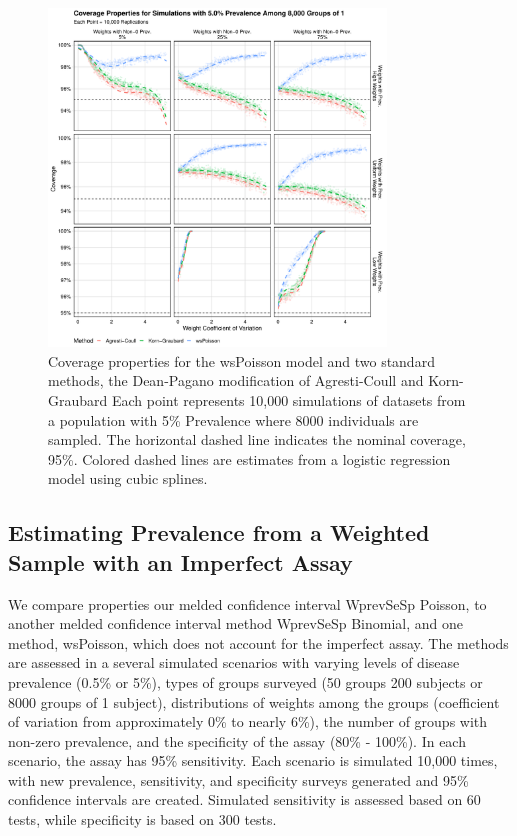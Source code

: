 \documentclass[AMA,STIX1COL]{WileyNJD-v2}
\begin{document}
\begin{figure}
\centering
\includegraphics[width=0.8\textwidth]{figures/perfect_coverage_8000_groups_0_05_prev.pdf}
\caption{Coverage properties for the wsPoisson model and two standard methods, the Dean-Pagano modification of Agresti-Coull and Korn-Graubard
Each point represents 10,000 simulations of datasets from a population with 5\% Prevalence where 8000 individuals are sampled.
The horizontal dashed line indicates the nominal coverage, 95\%.
Colored dashed lines are estimates from a logistic regression model using cubic splines.}
\label{fig:perfect_coverage_8000_groups_0_05_prev}
\end{figure}


\subsection{Estimating Prevalence from a Weighted Sample with an Imperfect Assay}


We compare properties our melded confidence interval WprevSeSp Poisson, to another melded confidence interval method WprevSeSp Binomial, and one method, wsPoisson, which does not account for the imperfect assay.
The methods are assessed in a several simulated scenarios with varying levels of disease prevalence (0.5\% or 5\%), types of groups surveyed (50 groups 200 subjects or 8000 groups of 1 subject), distributions of weights among the groups (coefficient of variation from approximately 0\% to nearly 6\%), the number of groups with non-zero prevalence, and the specificity of the assay (80\% - 100\%).
In each scenario, the assay has 95\% sensitivity.
Each scenario is simulated 10,000 times, with new prevalence, sensitivity, and specificity surveys generated and 95\% confidence intervals are created.
Simulated sensitivity is assessed based on 60 tests, while specificity is based on 300 tests.
\end{document}
